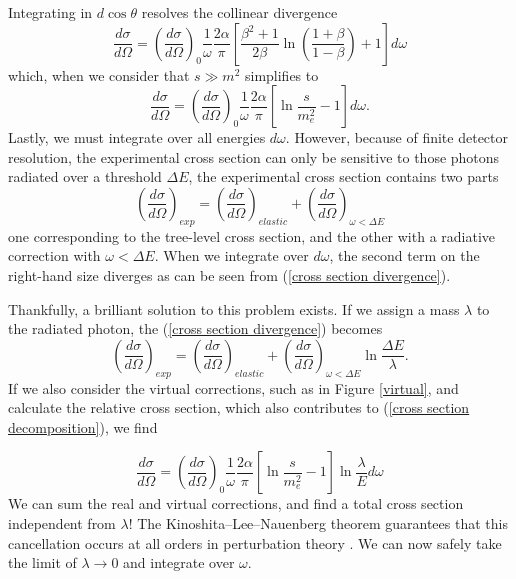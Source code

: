 \documentclass[10pt,a4paper]{book}
\begin{document}
Integrating in $d\cos\theta$ resolves the collinear divergence
\begin{equation}
\frac{d\sigma}{d\Omega} = \left(\frac{d\sigma}{d\Omega}\right)_0 \frac{1}{\omega} \frac{2\alpha}{\pi}\left[\frac{\beta^2 +1}{2\beta} \ln \left( \frac{1 + \beta}{1 - \beta}\right) +1 \right]d\omega
\end{equation}
which, when we consider that $s \gg m^2$ simplifies to
\begin{equation}
\frac{d\sigma}{d\Omega} = \left(\frac{d\sigma}{d\Omega}\right)_0 \frac{1}{\omega} \frac{2\alpha}{\pi}\left[\ln\frac{s}{m_e^2} - 1 \right] d\omega.
\label{cross section divergence}
\end{equation}
Lastly, we must integrate over all energies $d\omega$. However, because of finite detector resolution, the experimental cross section can only be sensitive to those photons radiated over a threshold $\Delta E$, the experimental cross section contains two parts
\begin{equation}
\left( \frac{d\sigma}{d\Omega}\right)_{exp} = \left( \frac{d\sigma}{d\Omega}\right)_{elastic} + \left( \frac{d\sigma}{d\Omega}\right)_{\omega < \Delta E}
\label{cross section decomposition}
\end{equation}
one corresponding to the tree-level cross section, and the other with a radiative correction with $\omega < \Delta E$. When we integrate over $d\omega$, the second term on the right-hand size diverges as can be seen from (\ref{cross section divergence}).

Thankfully, a brilliant solution to this problem exists. If we assign a mass $\lambda$ to the radiated photon, the (\ref{cross section divergence}) becomes
\begin{equation}
\left( \frac{d\sigma}{d\Omega}\right)_{exp} = \left( \frac{d\sigma}{d\Omega}\right)_{elastic} + \left( \frac{d\sigma}{d\Omega}\right)_{\omega < \Delta E}\ln \frac{\Delta E}{\lambda}.
\end{equation}
If we also consider the virtual corrections, such as in Figure \ref{virtual}, and calculate the relative cross section, which also contributes to (\ref{cross section decomposition}), we find

\begin{equation}
\frac{d\sigma}{d\Omega} = \left(\frac{d\sigma}{d\Omega}\right)_0 \frac{1}{\omega} \frac{2\alpha}{\pi}\left[\ln\frac{s}{m_e^2} - 1 \right] \ln \frac{\lambda}{E} d\omega
\end{equation}
We can sum the real and virtual corrections, and find a total cross section independent from $\lambda$! The Kinoshita–Lee–Nauenberg theorem guarantees that this cancellation occurs at all orders in perturbation theory \cite{Kinoshita:1962ur}. We can now safely take the limit of $\lambda \rightarrow 0$ and integrate over $\omega$.
\end{document}
